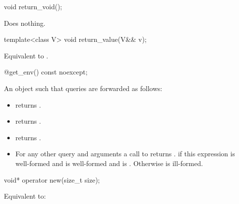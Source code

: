 %
\begin{itemdecl}
void return_void();
\end{itemdecl}
\begin{itemdescr}
\pnum
\effects
Does nothing.
\end{itemdescr}

%
\begin{itemdecl}
template<class V>
  void return_value(V&& v);
\end{itemdecl}
\begin{itemdescr}
\pnum
\effects
Equivalent to .
\end{itemdescr}

%
\begin{itemdecl}
@\unspec@ get_env() const noexcept;
\end{itemdecl}
\begin{itemdescr}
\pnum
\returns
An object  such that queries are forwarded as follows:
\begin{itemize}
\item {} returns .
\item {} returns .
\item {} returns .
\item For any other query  and arguments  a
call to  returns
.  if this expression
is well-formed and  is well-formed and is .
Otherwise  is ill-formed.
\end{itemize}
\end{itemdescr}

%
\begin{itemdecl}
void* operator new(size_t size);
\end{itemdecl}

\begin{itemdescr}
\pnum
\effects
Equivalent to:
\end{itemdescr}

